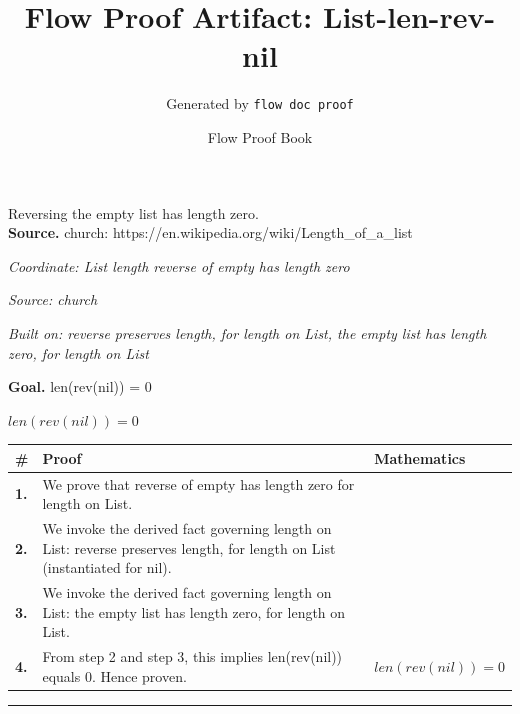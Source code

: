 \documentclass[11pt]{article}
\title{Flow Proof Artifact: List-len-rev-nil}
\author{Generated by \texttt{flow doc proof}}
\date{Flow Proof Book}
\theoremstyle{definition}
\begin{document}
\maketitle
Reversing the empty list has length zero.\\[0.5em]
\textbf{Source.} church: https://en.wikipedia.org/wiki/Length\_of\_a\_list\\[0.5em]
\bigskip
{}\par
\smallskip\noindent\textit{Coordinate: List \cdot length \cdot reverse of empty has length zero}\par
\smallskip\noindent\textit{Source: church}\par
\smallskip\noindent\textit{Built on: reverse preserves length, for length on List, the empty list has length zero, for length on List}\par
\medskip
\noindent\textbf{Goal.} len(rev(nil)) = 0\par
\noindent$\displaystyle len(rev(nil)) = 0$\par
\medskip
\noindent
\begin{tabular}{@{} >{\raggedright\arraybackslash}p{} >{\raggedright\arraybackslash}p{} >{\raggedleft\arraybackslash}p{} @{}}
\textbf{\#} & \textbf{Proof} & \textbf{Mathematics} \\
\midrule
\textbf{1.} & We prove that reverse of empty has length zero for length on List. & \\[0.45em]
\textbf{2.} & We invoke the derived fact governing length on List: reverse preserves length, for length on List (instantiated for nil). & \\[0.45em]
\textbf{3.} & We invoke the derived fact governing length on List: the empty list has length zero, for length on List. & \\[0.45em]
\textbf{4.} & From step 2 and step 3, this implies len(rev(nil)) equals 0. Hence proven. & $\displaystyle len(rev(nil)) = 0$ \\[0.45em]
\bottomrule
\end{tabular}
\label{thm:List-length-reverse_of_empty_has_length_zero}
\par\medskip\hrule
\end{document}
